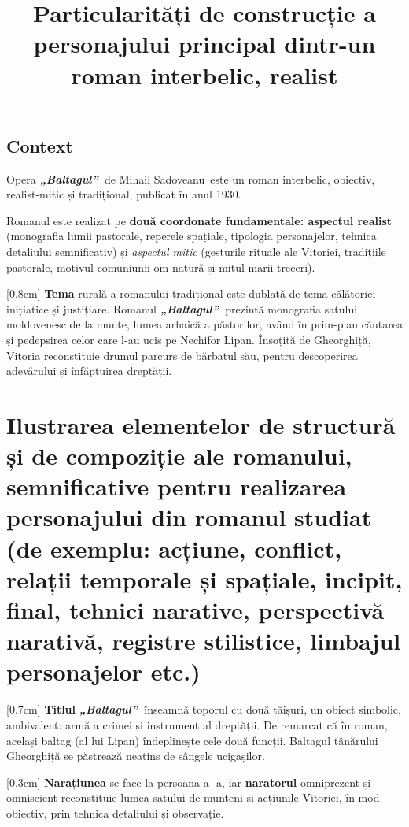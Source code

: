 \documentclass[
12pt,
a4paper
]{article}
\title{Particularități de construcție a personajului principal dintr-un roman interbelic, realist}
\date{}   %
\author{} %
\newcommand{\rom}[1]{\uppercase\expandafter{\romannumeral #1\relax}} %
\newcommand{\operatitle}{\textbf{\textit{„Baltagul”\ }}} %
\newcommand{\operaauthor}{Mihail Sadoveanu\ } %
\begin{document}
\maketitle %



\subsection{Context}

Opera \operatitle de \operaauthor este un roman interbelic, obiectiv, realist-mitic și tradițional, publicat în anul 1930.

Romanul este realizat pe \textbf{două coordonate fundamentale: aspectul realist} (monografia lumii pastorale, reperele spațiale, tipologia personajelor, tehnica detaliului semnificativ) și \textit{aspectul mitic} (gesturile rituale ale Vitoriei, tradițiile pastorale, motivul comuniunii om-natură și mitul marii treceri).

[0.8cm]
\textbf{Tema} rurală a romanului tradițional este dublată de tema călătoriei inițiatice și justițiare. Romanul \operatitle prezintă monografia satului moldovenesc de la munte, lumea arhaică a păstorilor, având în prim-plan căutarea și pedepsirea celor care l-au ucis pe Nechifor Lipan. Însoțită de Gheorghiță, Vitoria reconstituie drumul parcurs de bărbatul său, pentru descoperirea adevărului și înfăptuirea dreptății.

\section{Ilustrarea elementelor de structură și de compoziție ale romanului, semnificative pentru realizarea personajului din romanul studiat {\footnotesize (de exemplu: acțiune, conflict, relații temporale și spațiale, incipit, final, tehnici narative, perspectivă narativă, registre stilistice, limbajul personajelor etc.)}}

[0.7cm]
\textbf{Titlul} \operatitle înseamnă toporul cu două tăișuri, un obiect simbolic, ambivalent: armă a crimei și instrument al dreptății. De remarcat că în roman, același baltag (al lui Lipan) îndeplinește cele două funcții. Baltagul tânărului Gheorghiță se păstrează neatins de sângele ucigașilor.

[0.3cm]
\textbf{Narațiunea} se face la persoana a \rom{3}-a, iar \textbf{naratorul} omniprezent și omniscient reconstituie lumea satului de munteni și acțiunile Vitoriei, în mod obiectiv, prin tehnica detaliului și observație.
\end{document}
